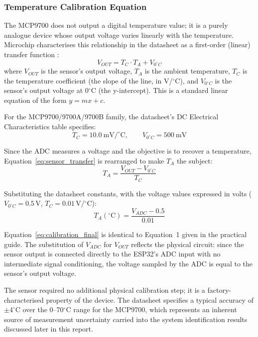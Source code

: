 \subsubsection{Temperature Calibration Equation}

The MCP9700 does not output a digital temperature value; it is a purely
analogue device whose output voltage varies linearly with the temperature. Microchip characterises this relationship
in the datasheet as a first-order (linear) transfer function \cite{mcp9700}:
\begin{equation}
    V_{OUT} = T_C \cdot T_A + V_{0^{\circ}C}
    \label{eq:sensor_transfer}
\end{equation}
where $V_{OUT}$ is the sensor's output voltage, $T_A$ is the ambient
temperature, $T_C$ is the temperature coefficient (the slope of the line,
in V/$^{\circ}$C), and $V_{0^{\circ}C}$ is the sensor's output voltage at
0$^{\circ}$C (the y-intercept). This is a standard linear equation of the
form $y = mx + c$.

For the MCP9700/9700A/9700B family, the datasheet's DC Electrical
Characteristics table specifies:
\begin{equation}
    T_C = 10.0\ \text{mV/}^{\circ}\text{C}, \qquad
    V_{0^{\circ}C} = 500\ \text{mV}
\end{equation}

Since the ADC measures a voltage and the objective is to recover a
temperature, Equation~\eqref{eq:sensor_transfer} is rearranged to make
$T_A$ the subject:
\begin{equation}
    T_A = \frac{V_{OUT} - V_{0^{\circ}C}}{T_C}
    \label{eq:sensor_rearranged}
\end{equation}

Substituting the datasheet constants, with the voltage values expressed in
volts ($V_{0^{\circ}C} = 0.5$\,V, $T_C = 0.01$\,V/$^{\circ}$C):
\begin{equation}
    T_A(^{\circ}\text{C}) = \frac{V_{ADC} - 0.5}{0.01}
    \label{eq:calibration_final}
\end{equation}

Equation~\eqref{eq:calibration_final} is identical to Equation~1 given in
the practical guide. The substitution of $V_{ADC}$ for $V_{OUT}$ reflects
the physical circuit: since the sensor output is connected directly to the
ESP32's ADC input with no intermediate signal conditioning, the voltage
sampled by the ADC is equal to the sensor's output voltage.

The sensor required no additional physical calibration step; it is a factory-characterised property of the
device. The datasheet specifies a typical accuracy of $\pm 4^{\circ}$C over
the 0--70$^{\circ}$C range for the MCP9700, which represents an inherent
source of measurement uncertainty carried into the system identification
results discussed later in this report.